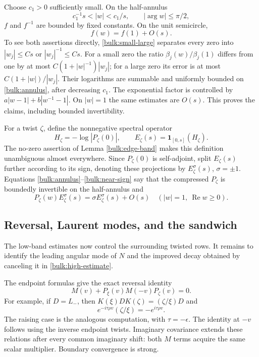 Choose $c_1>0$ sufficiently small. On the half-annulus
\begin{equation}\label{bulk:annulus}
 c_1^{-1}s<|w|<c_1/s,\qquad |\arg w|\le\pi/2,
\end{equation}
$f$ and $f^{-1}$ are bounded by fixed constants. On the unit
semicircle,
\begin{equation}\label{bulk:near-sign}
 f(w)=f(1)+O(s).
\end{equation}
To see both assertions directly, \eqref{bulk:small-large} separates
every zero into $|w_j|\le Cs$ or $|w_j|^{-1}\le Cs$. For a small
zero the ratio $\beta_j(w)/\beta_j(1)$ differs from one by at most
$C(1+|w|^{-1})|w_j|$; for a large zero its error is at most
$C(1+|w|)/|w_j|$. Their logarithms are summable and uniformly
bounded on \eqref{bulk:annulus}, after decreasing $c_1$.
The exponential factor is controlled by
$a|w-1|+b|w^{-1}-1|$. On $|w|=1$ the same estimates are $O(s)$.
This proves the claims, including bounded invertibility.

For a twist $\zeta$, define the nonnegative spectral operator
\[
 H_\zeta=-\log|P_\zeta(0)|,\qquad
 E_\zeta(s)=\mathbf1_{[0,s]}(H_\zeta).
\]
The no-zero assertion of Lemma \ref{bulk:edge-band} makes this
definition unambiguous almost everywhere. Since $P_\zeta(0)$ is
self-adjoint, split $E_\zeta(s)$ further according to its sign,
denoting these projections by $E_\zeta^\sigma(s)$,
$\sigma=\pm1$. Equations \eqref{bulk:annulus}--\eqref{bulk:near-sign}
say that the compressed $P_\zeta$ is boundedly invertible on the
half-annulus and
\begin{equation}\label{bulk:sign-approx}
 P_\zeta(w)E_\zeta^\sigma(s)
 =\sigma E_\zeta^\sigma(s)+O(s)
 \quad (|w|=1,\ \operatorname{Re}w\ge0).
\end{equation}

\subsection{Reversal, Laurent modes, and the sandwich}

The low-band estimates now control the surrounding twisted rows.  It
remains to identify the leading angular mode of $N$ and the improved
decay obtained by canceling it in \eqref{bulk:high-estimate}.

The endpoint formulas give the exact reversal identity
\begin{equation}\label{bulk:reversal}
 M(v)+P_\xi(v)M(-v)P_\zeta(v)=0.
\end{equation}
For example, if $D=L_-$, then
$K(\xi)DK(\zeta)=(\zeta/\xi)D$ and
\[
 e^{-i\tau\rho v}(\zeta/\xi)=-e^{i\tau\rho v}.
\]
The raising case is the analogous computation, with
$\tau=-\epsilon$. The identity at $-v$ follows using the inverse
endpoint twists. Imaginary covariance extends these relations
after every common imaginary shift: both $M$ terms acquire the
same scalar multiplier. Boundary convergence is strong.

